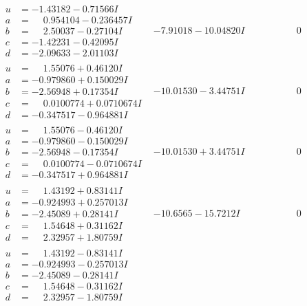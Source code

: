 \documentclass[1p]{elsarticle_modified}
\theoremstyle{definition}
\begin{document}
$$\begin{array}{c|c|c}
 \hline 
\begin{aligned}
u &= -1.43182 - 0.71566 I \\
a &= \phantom{-}0.954104 - 0.236457 I \\
b &= \phantom{-}2.50037 - 0.27104 I \\
c &= -1.42231 - 0.42095 I \\
d &= -2.09633 - 2.01103 I\end{aligned}
 & -7.91018 - 10.04820 I & \phantom{-0.000000 } 0 \\ \hline\begin{aligned}
u &= \phantom{-}1.55076 + 0.46120 I \\
a &= -0.979860 + 0.150029 I \\
b &= -2.56948 + 0.17354 I \\
c &= \phantom{-}0.0100774 + 0.0710674 I \\
d &= -0.347517 - 0.964881 I\end{aligned}
 & -10.01530 - 3.44751 I & \phantom{-0.000000 } 0 \\ \hline\begin{aligned}
u &= \phantom{-}1.55076 - 0.46120 I \\
a &= -0.979860 - 0.150029 I \\
b &= -2.56948 - 0.17354 I \\
c &= \phantom{-}0.0100774 - 0.0710674 I \\
d &= -0.347517 + 0.964881 I\end{aligned}
 & -10.01530 + 3.44751 I & \phantom{-0.000000 } 0 \\ \hline\begin{aligned}
u &= \phantom{-}1.43192 + 0.83141 I \\
a &= -0.924993 + 0.257013 I \\
b &= -2.45089 + 0.28141 I \\
c &= \phantom{-}1.54648 + 0.31162 I \\
d &= \phantom{-}2.32957 + 1.80759 I\end{aligned}
 & -10.6565 - 15.7212 I & \phantom{-0.000000 } 0 \\ \hline\begin{aligned}
u &= \phantom{-}1.43192 - 0.83141 I \\
a &= -0.924993 - 0.257013 I \\
b &= -2.45089 - 0.28141 I \\
c &= \phantom{-}1.54648 - 0.31162 I \\
d &= \phantom{-}2.32957 - 1.80759 I\end{aligned}

\end{array}$$
\end{document}
